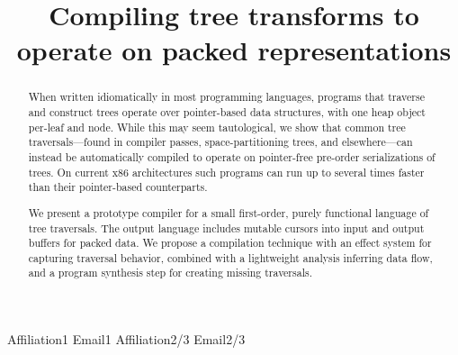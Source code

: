 \documentclass[preprint,10pt,nocopyrightspace,nonatbib]{./bibs/sigplanconf}
\begin{document}
\setlength{\pdfpageheight}{\paperheight}
\setlength{\pdfpagewidth}{\paperwidth}




\newcommand{\treelang}{Gibbon} %

\title{Compiling tree transforms to operate on packed representations}

           {Affiliation1}
           {Email1}
           {Affiliation2/3}
           {Email2/3}

\maketitle

\begin{abstract}
When written idiomatically in most programming languages, programs that traverse
and construct trees operate over pointer-based data structures, with one heap
object per-leaf and node.  While this may seem tautological, we show that common
tree traversals---found in compiler passes, space-partitioning trees, and
elsewhere---can instead be automatically compiled to operate on pointer-free
pre-order serializations of trees.  On current x86 architectures such programs
can run up to several times faster than their pointer-based counterparts.

We present a prototype compiler for a small first-order, purely functional
language of tree traversals.  The output language includes mutable cursors into
input and output buffers for packed data.  We propose a compilation technique
with an effect system for capturing traversal behavior, combined with a
lightweight analysis inferring data flow, and a program synthesis step for
creating missing traversals.
  
\end{abstract}

\end{document}

